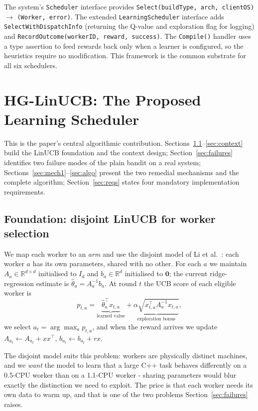 \documentclass[final,5p,times,twocolumn]{elsarticle}
\begin{document}
The system's \texttt{Scheduler} interface provides \texttt{Select(buildType, arch, clientOS)} $\to$ \texttt{(Worker, error)}. The extended \texttt{LearningScheduler} interface adds \texttt{SelectWithDispatchInfo} (returning the Q-value and exploration flag for logging) and \texttt{RecordOutcome(workerID, reward, success)}. The \texttt{Compile()} handler uses a type assertion to feed rewards back only when a learner is configured, so the heuristics require no modification. This framework is the common substrate for all six schedulers.

\section{HG-LinUCB: The Proposed Learning Scheduler}
\label{sec:hglinucb}

This is the paper's central algorithmic contribution. Sections~\ref{sec:linucb}--\ref{sec:context} build the LinUCB foundation and the context design; Section~\ref{sec:failures} identifies two failure modes of the plain bandit on a real system; Sections~\ref{sec:mech1}--\ref{sec:algo} present the two remedial mechanisms and the complete algorithm; Section~\ref{sec:reqs} states four mandatory implementation requirements.

\subsection{Foundation: disjoint LinUCB for worker selection}
\label{sec:linucb}

We map each worker to an \emph{arm} and use the disjoint model of Li et al.~\cite{li2010}: each worker $a$ has its own parameters, shared with no other. For each $a$ we maintain $A_a\in\mathbb{R}^{d\times d}$ initialised to $I_d$ and $b_a\in\mathbb{R}^d$ initialised to $\mathbf{0}$; the current ridge-regression estimate is $\hat{\theta}_a=A_a^{-1}b_a$. At round $t$ the UCB score of each eligible worker is
\begin{equation}
p_{t,a}=\underbrace{\hat{\theta}_a^\top x_{t,a}}_{\text{learned value}}+\underbrace{\alpha\sqrt{x_{t,a}^\top A_a^{-1}x_{t,a}}}_{\text{exploration bonus}},
\end{equation}
we select $a_t=\arg\max_a p_{t,a}$, and when the reward arrives we update $A_{a_t}\leftarrow A_{a_t}+xx^\top$, $b_{a_t}\leftarrow b_{a_t}+rx$.

The disjoint model suits this problem: workers are physically distinct machines, and we \emph{want} the model to learn that a large C++ task behaves differently on a 0.5-CPU worker than on a 1.1-CPU worker - sharing parameters would blur exactly the distinction we need to exploit. The price is that each worker needs its own data to warm up, and that is one of the two problems Section~\ref{sec:failures} raises.
\end{document}
